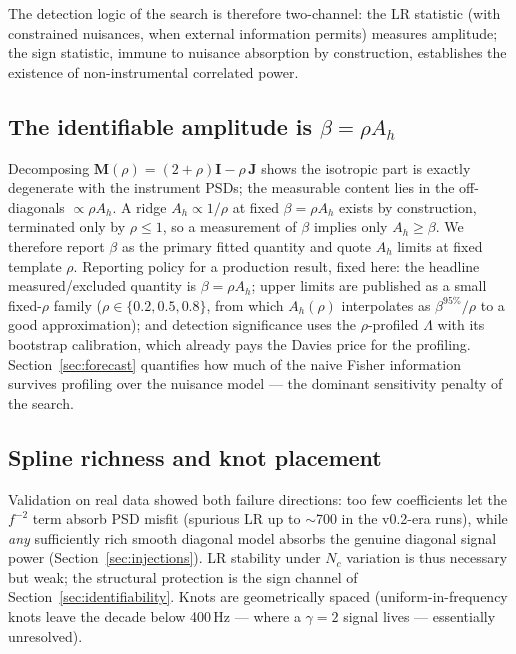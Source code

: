 \documentclass[11pt]{article}
\newcommand{\Ah}{A_h}
\newcommand{\betaeff}{\beta}
\begin{document}
The detection logic of the search is therefore two-channel: the LR statistic (with constrained nuisances, when external information permits) measures amplitude; the sign statistic, immune to nuisance absorption by construction, establishes the existence of non-instrumental correlated power.

\subsection{The identifiable amplitude is $\betaeff = \rho \Ah$}
\label{sec:beta}

Decomposing $\mathbf{M}(\rho) = (2+\rho)\mathbf{I} - \rho\,\mathbf{J}$ shows the isotropic part is exactly degenerate with the instrument PSDs; the measurable content lies in the off-diagonals $\propto \rho\Ah$. A ridge $\Ah \propto 1/\rho$ at fixed $\betaeff = \rho\Ah$ exists by construction, terminated only by $\rho \le 1$, so a measurement of $\betaeff$ implies only $\Ah \ge \betaeff$. We therefore report $\betaeff$ as the primary fitted quantity and quote $\Ah$ limits at fixed template $\rho$. Reporting policy for a production result, fixed here: the headline measured/excluded quantity is $\betaeff = \rho\Ah$; upper limits are published as a small fixed-$\rho$ family ($\rho \in \{0.2, 0.5, 0.8\}$, from which $\Ah(\rho)$ interpolates as $\betaeff^{95\%}/\rho$ to a good approximation); and detection significance uses the $\rho$-profiled $\Lambda$ with its bootstrap calibration, which already pays the Davies price for the profiling. Section~\ref{sec:forecast} quantifies how much of the naive Fisher information survives profiling over the nuisance model --- the dominant sensitivity penalty of the search.

\subsection{Spline richness and knot placement}
Validation on real data showed both failure directions: too few coefficients let the $f^{-2}$ term absorb PSD misfit (spurious LR up to $\sim$700 in the v0.2-era runs), while \emph{any} sufficiently rich smooth diagonal model absorbs the genuine diagonal signal power (Section~\ref{sec:injections}). LR stability under $N_c$ variation is thus necessary but weak; the structural protection is the sign channel of Section~\ref{sec:identifiability}. Knots are geometrically spaced (uniform-in-frequency knots leave the decade below 400\,Hz --- where a $\gamma = 2$ signal lives --- essentially unresolved).
\end{document}
